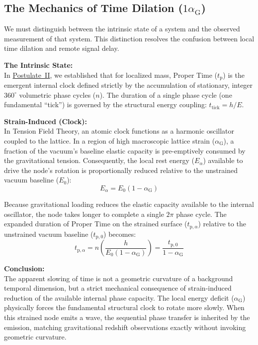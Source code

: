 \subsection*{The Mechanics of Time Dilation ($1\alpha_{\mathrm{G}}$)}

We must distinguish between the intrinsic state of a system and the observed measurement of that system. This distinction resolves the confusion between local time dilation and remote signal delay.

\vspace{0.5em}
\noindent\textbf{The Intrinsic State:}\\
In \hyperref[postulate:two]{\hyperref[postulate:two]{Postulate~II}}, we established that for localized mass, Proper Time ($t_{\mathrm{p}}$) is the emergent internal clock defined strictly by the accumulation of stationary, integer $360^{\circ}$ volumetric phase cycles ($n$). The duration of a single phase cycle (one fundamental ``tick'') is governed by the structural energy coupling: $t_{\mathrm{tick}} = h/E$.

\vspace{0.5em}
\noindent\textbf{Strain-Induced (Clock):}\\
In Tension Field Theory, an atomic clock functions as a harmonic oscillator coupled to the lattice. In a region of high macroscopic lattice strain ($\alpha_{\mathrm{G}}$), a fraction of the vacuum's baseline elastic capacity is pre-emptively consumed by the gravitational tension. Consequently, the local rest energy ($E_{\alpha}$) available to drive the node's rotation is proportionally reduced relative to the unstrained vacuum baseline ($E_0$):
\begin{equation}
    E_{\alpha} = E_0(1 - \alpha_{\mathrm{G}})
\end{equation}

Because gravitational loading reduces the elastic capacity available to the internal oscillator, the node takes longer to complete a single $2\pi$ phase cycle. The expanded duration of Proper Time on the strained surface ($t_{\mathrm{p}, \alpha}$) relative to the unstrained vacuum baseline ($t_{\mathrm{p}, 0}$) becomes:
\begin{equation}
    t_{\mathrm{p}, \alpha} = n \left( \frac{h}{E_0(1 - \alpha_{\mathrm{G}})} \right) = \frac{t_{\mathrm{p}, 0}}{1 - \alpha_{\mathrm{G}}}
\end{equation}

\vspace{0.5em}
\noindent\textbf{Conclusion:}\\
The apparent slowing of time is not a geometric curvature of a background temporal dimension, but a strict mechanical consequence of strain-induced reduction of the available internal phase capacity. The local energy deficit ($\alpha_{\mathrm{G}}$) physically forces the fundamental structural clock to rotate more slowly. When this strained node emits a wave, the sequential phase transfer is inherited by the emission, matching gravitational redshift observations exactly without invoking geometric curvature.

